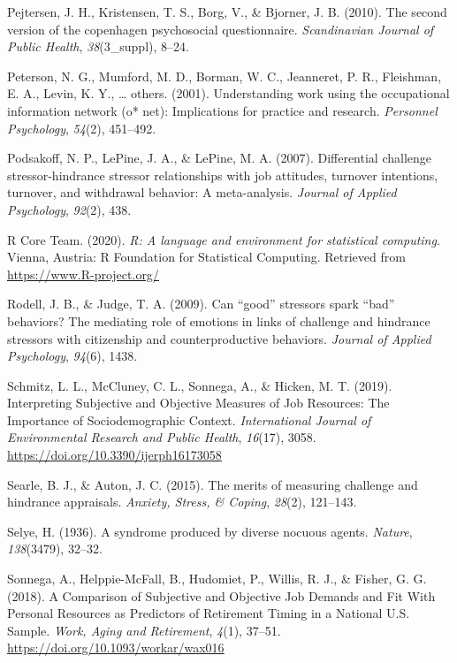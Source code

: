 \documentclass[
  english,
  man]{apa6}
\begin{document}
\leavevmode\hypertarget{ref-pejtersen2010second}{}%
Pejtersen, J. H., Kristensen, T. S., Borg, V., \& Bjorner, J. B. (2010). The second version of the copenhagen psychosocial questionnaire. \emph{Scandinavian Journal of Public Health}, \emph{38}(3\_suppl), 8--24.

\leavevmode\hypertarget{ref-peterson2001understanding}{}%
Peterson, N. G., Mumford, M. D., Borman, W. C., Jeanneret, P. R., Fleishman, E. A., Levin, K. Y., \ldots{} others. (2001). Understanding work using the occupational information network (o* net): Implications for practice and research. \emph{Personnel Psychology}, \emph{54}(2), 451--492.

\leavevmode\hypertarget{ref-podsakoff2007differential}{}%
Podsakoff, N. P., LePine, J. A., \& LePine, M. A. (2007). Differential challenge stressor-hindrance stressor relationships with job attitudes, turnover intentions, turnover, and withdrawal behavior: A meta-analysis. \emph{Journal of Applied Psychology}, \emph{92}(2), 438.

\leavevmode\hypertarget{ref-R-base}{}%
R Core Team. (2020). \emph{R: A language and environment for statistical computing}. Vienna, Austria: R Foundation for Statistical Computing. Retrieved from \url{https://www.R-project.org/}

\leavevmode\hypertarget{ref-rodell2009can}{}%
Rodell, J. B., \& Judge, T. A. (2009). Can ``good'' stressors spark ``bad'' behaviors? The mediating role of emotions in links of challenge and hindrance stressors with citizenship and counterproductive behaviors. \emph{Journal of Applied Psychology}, \emph{94}(6), 1438.

\leavevmode\hypertarget{ref-schmitz_interpreting_2019}{}%
Schmitz, L. L., McCluney, C. L., Sonnega, A., \& Hicken, M. T. (2019). Interpreting Subjective and Objective Measures of Job Resources: The Importance of Sociodemographic Context. \emph{International Journal of Environmental Research and Public Health}, \emph{16}(17), 3058. \url{https://doi.org/10.3390/ijerph16173058}

\leavevmode\hypertarget{ref-searle2015merits}{}%
Searle, B. J., \& Auton, J. C. (2015). The merits of measuring challenge and hindrance appraisals. \emph{Anxiety, Stress, \& Coping}, \emph{28}(2), 121--143.

\leavevmode\hypertarget{ref-selye1936syndrome}{}%
Selye, H. (1936). A syndrome produced by diverse nocuous agents. \emph{Nature}, \emph{138}(3479), 32--32.

\leavevmode\hypertarget{ref-sonnega_comparison_2018}{}%
Sonnega, A., Helppie-McFall, B., Hudomiet, P., Willis, R. J., \& Fisher, G. G. (2018). A Comparison of Subjective and Objective Job Demands and Fit With Personal Resources as Predictors of Retirement Timing in a National U.S. Sample. \emph{Work, Aging and Retirement}, \emph{4}(1), 37--51. \url{https://doi.org/10.1093/workar/wax016}
\end{document}
